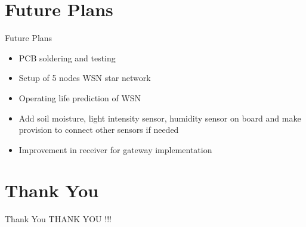 \documentclass[10pt, a4paper]{beamer}
\begin{document}
\section{Future Plans}
\begin{frame}{Future Plans}
	\begin{itemize}
		\item PCB soldering and testing
        \item Setup of 5 nodes WSN star network
        \item Operating life prediction of WSN
        \item Add soil moisture, light intensity sensor, humidity sensor on board and make provision to connect other sensors if needed
        \item Improvement in receiver for gateway implementation
	\end{itemize}
\end{frame}


\section{Thank You}
\begin{frame}{Thank You}
	\centering THANK YOU !!!
\end{frame}
\end{document}
